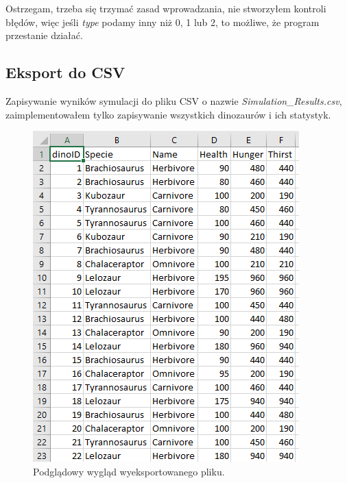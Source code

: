 Ostrzegam, trzeba się trzymać zasad wprowadzania, nie stworzyłem kontroli błędów, więc jeśli \textit{type} podamy inny niż 0, 1 lub 2, to możliwe, że program przestanie działać.

\newpage
\subsection{Eksport do CSV}

Zapisywanie wyników symulacji do pliku CSV o nazwie \textit{Simulation\_Results.csv}, zaimplementowałem tylko zapisywanie wszystkich dinozaurów i ich statystyk.

\begin{figure}[h!]
    \centering
    \includegraphics{images/csv.png}
    \caption{Podglądowy wygląd wyeksportowanego pliku.}
    \label{fig:my_label}
\end{figure}


